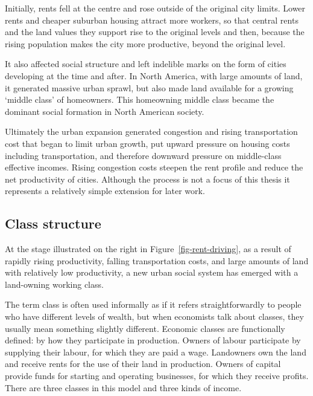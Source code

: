
Initially, rents fell at the centre and rose outside of the original city limits. Lower rents and cheaper suburban housing attract more workers, so that central rents and the land values they support  rise to the original levels and then, because the rising population makes the city more productive, beyond the original level. 

It  also affected social structure and left indelible marks on the form of cities developing at the time and after. In North America, with large amounts of land, it generated massive urban sprawl, but also made land available for a growing `middle class' of homeowners. This homeowning middle class became the dominant social formation in North 
American society. 

Ultimately the urban expansion generated congestion and rising transportation cost that began to limit urban growth, put upward pressure on  housing costs including transportation, and therefore downward pressure on middle-class effective incomes. Rising congestion costs steepen the rent profile and  reduce the net productivity of cities. Although the process is not a focus of this thesis it represents a relatively simple extension for later work.

\subsection{Class structure}\label{sec-class-structure}
At the stage illustrated on the right  in Figure~\ref{fig-rent-driving},  %
as a result of rapidly rising productivity, falling transportation costs, and large amounts of land with relatively low productivity, a new urban social system has emerged with a land-owning working class. 

The term \gls{class} is often used informally as if it refers straightforwardly to people who have different levels of wealth, but when economists talk about classes, they usually mean something slightly different. Economic classes are functionally defined:  by how they participate in production. Owners of labour participate by supplying their labour, for which they are paid a wage. Landowners own the land and receive rents for the use of their land in production. Owners of capital provide funds for starting and operating businesses, for which they receive profits.  There are three classes in this model and three kinds of income.  %

